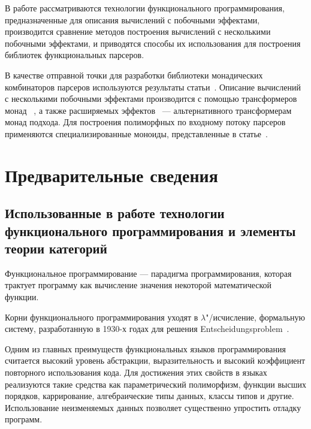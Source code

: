 





\Intro
В работе рассматриваются технологии функционального программирования, 
предназначенные для описания вычислений с побочными эффектами, производится 
сравнение методов построения вычислений с несколькими побочными эффектами,
и приводятся способы их использования для построения библиотек функциональных 
парсеров.

В качестве отправной точки для разработки библиотеки монадических комбинаторов
парсеров используются результаты статьи~\cite{monParsing}. Описание вычислений
с несколькими побочными эффектами производится с помощью трансформеров монад
~\cite{monadTransformers}, а также расширяемых эффектов~\cite{extEffects} --- 
альтернативного трансформерам монад подхода. Для построения полиморфных по 
входному потоку парсеров применяются специализированные моноиды, представленные 
в статье~\cite{monoids}.

\chapter{Предварительные сведения}

\section{Использованные в работе технологии функционального программирования и элементы теории категорий}

Функциональное программирование --- парадигма программирования, которая трактует 
программу как вычисление значения некоторой математической функции.

Корни функционального программирования уходят в $\lambda$"/исчисление, 
формальную систему, разработанную в 1930-х годах для решения 
Entscheidungsproblem~\cite{entscheidungsproblem}.

Одним из главных преимуществ функциональных языков программирования считается 
высокий уровень абстракции, выразительность и высокий коэффициент повторного 
использования кода. Для достижения этих свойств в языках реализуются такие 
средства как параметрический полиморфизм, функции высших порядков, каррирование, 
алгебраические типы данных, классы типов и другие. Использование неизменяемых 
данных позволяет существенно упростить отладку программ.

